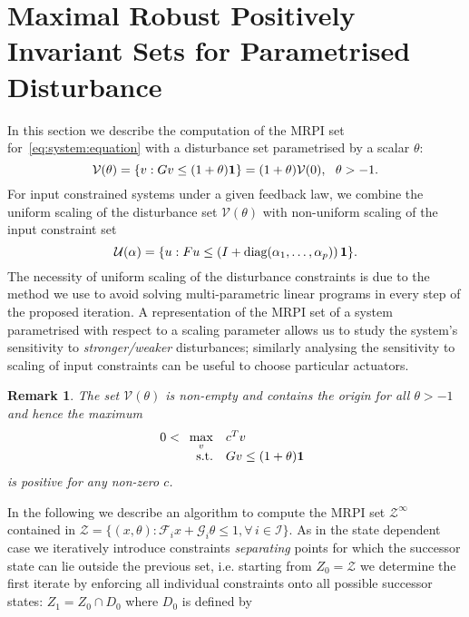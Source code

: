\documentclass[letterpaper, 10pt, conference]{ieeeconf} %
\newtheorem{rem}[thm]{Remark}
\begin{document}
\section{Maximal Robust Positively Invariant Sets for Parametrised Disturbance}\label{sec:MRPI:parametrised}
%
%
In this section we describe the computation of the MRPI set for~\eqref{eq:system:equation} with a disturbance set 
parametrised by a scalar $\theta$:
%
\[
\mathcal V(\theta) = \{v: Gv\leq(1+\theta){\bf{1}}\} 
= (1+\theta)\mathcal V(0), \ \ \theta>-1.
\]
%
For input constrained systems under a given feedback law, we combine the uniform scaling of 
the disturbance set $\mathcal V(\theta)$ with non-uniform scaling of the input constraint set
%
\[
\mathcal U({\bf{\alpha}}) = \{u: Fu\leq\left(I+\text{diag}(\alpha_1,\dots,\alpha_p)\right){\bf{1}}\}.
\]
%
The necessity of uniform scaling of the disturbance constraints is due to the method we use to avoid
solving multi-parametric linear programs in every step of the proposed iteration.
A representation of the MRPI set of a system parametrised with respect to a scaling parameter allows us
to study the system's sensitivity to \emph{stronger/weaker} disturbances; similarly analysing the sensitivity to scaling of input 
constraints can be useful to choose particular actuators.
%
\begin{rem}
The set $\mathcal V(\theta)$ is non-empty and contains the origin for all $\theta>-1$ and hence the 
maximum
%
\[
0<\begin{array}[t]{rl}
\displaystyle\max_v & c^T v\\
\text{s.t.}& Gv \leq (1+\theta){\bf{1}}
\end{array}
\]
%
is positive for any non-zero $c$.
\end{rem}
%
In the following we describe an algorithm to compute the MRPI set $\mathcal Z^\infty$ contained in 
$\mathcal Z = \{(x,\theta):\mathcal F_i x+\mathcal G_i\theta \leq 1,\forall\, i\in\mathcal I\}$.
As in the state dependent case we iteratively introduce constraints \emph{separating} points
for which the successor state can lie outside the previous set, i.e. starting from $Z_0 = \mathcal Z$
we determine the first iterate by enforcing all individual constraints onto all possible successor states:
$Z_1=Z_0\cap D_0$ where $D_0$ is defined by
%
\end{document}
